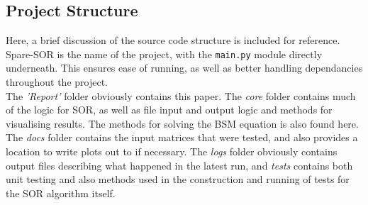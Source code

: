 \documentclass[paper=a4, fontsize=10pt]{scrartcl} %
\begin{document}
\subsection {Project Structure}
{Here, a brief discussion of the source code structure is included for reference. Spare-SOR is the name of the project, with the \texttt{main.py} module directly underneath. This ensures ease of running, as well as better handling dependancies throughout the project.  }\\
\vspace{0.5cm}
{The {\it 'Report'} folder obviously contains this paper. The {\it core} folder contains much of the logic for SOR, as well as file input and output logic and methods for visualising results. The methods for solving the BSM equation is also found here. The {\it docs} folder contains the input matrices that were tested, and also provides a location to write plots out to if necessary. The {\it logs} folder obviously contains output files describing what happened in the latest run, and {\it tests} contains both unit testing and also methods used in the construction and running of tests for the SOR algorithm itself.}   
\end{document}
